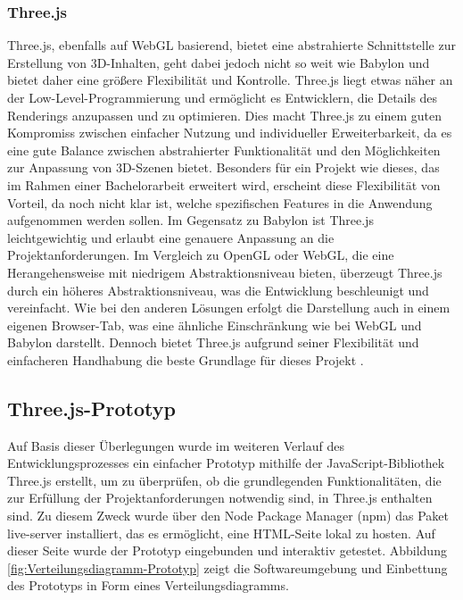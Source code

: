 \subsubsection{Three.js}
Three.js, ebenfalls auf WebGL basierend, bietet eine abstrahierte Schnittstelle zur Erstellung von 3D-Inhalten,
geht dabei jedoch nicht so weit wie Babylon und bietet daher eine größere Flexibilität und Kontrolle.
Three.js liegt etwas näher an der Low-Level-Programmierung und ermöglicht es Entwicklern, die Details des Renderings anzupassen und zu optimieren.
Dies macht Three.js zu einem guten Kompromiss zwischen einfacher Nutzung und individueller Erweiterbarkeit,
da es eine gute Balance zwischen abstrahierter Funktionalität und den Möglichkeiten zur Anpassung von 3D-Szenen bietet.
Besonders für ein Projekt wie dieses, das im Rahmen einer Bachelorarbeit erweitert wird, erscheint diese Flexibilität von Vorteil,
da noch nicht klar ist, welche spezifischen Features in die Anwendung aufgenommen werden sollen. Im Gegensatz zu Babylon ist Three.js
leichtgewichtig und erlaubt eine genauere Anpassung an die Projektanforderungen.
Im Vergleich zu OpenGL oder WebGL, die eine Herangehensweise mit niedrigem Abstraktionsniveau bieten, überzeugt Three.js durch ein höheres Abstraktionsniveau,
was die Entwicklung beschleunigt und vereinfacht.
Wie bei den anderen Lösungen erfolgt die Darstellung auch in einem eigenen Browser-Tab, was eine ähnliche Einschränkung wie bei WebGL und Babylon darstellt.
Dennoch bietet Three.js aufgrund seiner Flexibilität und einfacheren Handhabung die beste Grundlage für dieses Projekt .

\subsection{Three.js-Prototyp}
Auf Basis dieser Überlegungen wurde im weiteren Verlauf des Entwicklungsprozesses ein einfacher Prototyp mithilfe der JavaScript-Bibliothek Three.js erstellt,
um zu überprüfen, ob die grundlegenden Funktionalitäten, die zur Erfüllung der Projektanforderungen notwendig sind, in Three.js enthalten sind.
Zu diesem Zweck wurde über den Node Package Manager (npm) das Paket live-server installiert, das es ermöglicht, eine HTML-Seite lokal zu hosten.
Auf dieser Seite wurde der Prototyp eingebunden und interaktiv getestet.
Abbildung \ref{fig:Verteilungsdiagramm-Prototyp} zeigt die Softwareumgebung und Einbettung des Prototyps in Form eines Verteilungsdiagramms.
\vspace{1em}

